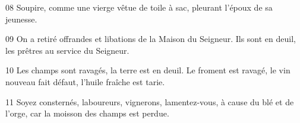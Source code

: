 
08 Soupire, comme une vierge vêtue de toile à sac, pleurant l’époux de sa jeunesse.

09 On a retiré offrandes et libations de la Maison du Seigneur. Ils sont en deuil, les prêtres au service du Seigneur.

10 Les champs sont ravagés, la terre est en deuil. Le froment est ravagé, le vin nouveau fait défaut, l’huile fraîche est tarie.

11 Soyez consternés, laboureurs, vignerons, lamentez-vous, à cause du blé et de l’orge, car la moisson des champs est perdue.